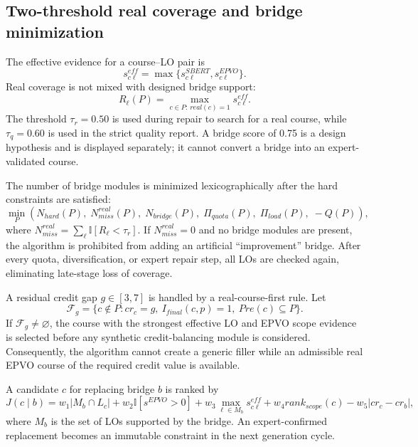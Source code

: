 \documentclass[twoside,11pt]{article}
\begin{document}
\subsection{Two-threshold real coverage and bridge minimization}

The effective evidence for a course--LO pair is
\begin{equation}
s_{c\ell}^{eff}=\max\{s_{c\ell}^{SBERT},s_{c\ell}^{EPVO}\}.
\label{eq:effective-lo-link}
\end{equation}
Real coverage is not mixed with designed bridge support:
\begin{equation}
R_{\ell}(P)=\max_{c\in P:\,real(c)=1}s_{c\ell}^{eff}.
\label{eq:real-lo-coverage}
\end{equation}
The threshold $\tau_r=0.50$ is used during repair to search for a real course, while $\tau_q=0.60$ is used in the strict quality report. A bridge score of 0.75 is a design hypothesis and is displayed separately; it cannot convert a bridge into an expert-validated course.

The number of bridge modules is minimized lexicographically after the hard constraints are satisfied:
\begin{equation}
\min_P\left(
N_{hard}(P),\;N_{miss}^{real}(P),\;N_{bridge}(P),\;
\Pi_{quota}(P),\;\Pi_{load}(P),\;-Q(P)
\right),
\label{eq:lexicographic-repair}
\end{equation}
where $N_{miss}^{real}=\sum_{\ell}\mathbb{I}[R_{\ell}<\tau_r]$. If $N_{miss}^{real}=0$ and no bridge modules are present, the algorithm is prohibited from adding an artificial ``improvement'' bridge. After every quota, diversification, or expert repair step, all LOs are checked again, eliminating late-stage loss of coverage.

A residual credit gap $g\in[3,7]$ is handled by a real-course-first rule. Let
\begin{equation}
\mathcal{F}_g=\{c\notin P:cr_c=g,\ I_{final}(c,p)=1,\
Pre(c)\subseteq P\}.
\label{eq:real-credit-fill-set}
\end{equation}
If $\mathcal{F}_g\ne\varnothing$, the course with the strongest effective LO and EPVO scope evidence is selected before any synthetic credit-balancing module is considered. Consequently, the algorithm cannot create a generic filler while an admissible real EPVO course of the required credit value is available.

A candidate $c$ for replacing bridge $b$ is ranked by
\begin{equation}
J(c\mid b)=w_1|M_b\cap L_c|+w_2\mathbb{I}[s^{EPVO}>0]
+w_3\max_{\ell\in M_b}s_{c\ell}^{eff}
+w_4 rank_{scope}(c)-w_5|cr_c-cr_b|,
\label{eq:bridge-candidate-ranking}
\end{equation}
where $M_b$ is the set of LOs supported by the bridge. An expert-confirmed replacement becomes an immutable constraint in the next generation cycle.
\end{document}
